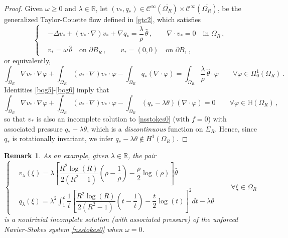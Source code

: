 \documentclass[a4paper,11pt]{article}
\newtheorem{remark}[theorem]{Remark}
\numberwithin{equation}{section}
\numberwithin{figure}{section}
\begin{document}
\begin{proof}
Given $\omega \geq 0$ and $\lambda \in \mathbb{R}$, let $(v_{*},q_{*}) \in \mathcal{C}^\infty(\overline{\Omega_{R}}) \times
\mathcal{C}^\infty(\overline{\Omega_{R}})$, be the generalized Taylor-Couette flow defined in \eqref{gtc2}, which satisfies
$$
\left\{
\begin{aligned}
	& -\Delta v_{*}+ (v_{*}\cdot\nabla)v_{*}+ \nabla q_{*}=\dfrac{\lambda}{\rho}\, \widehat{\theta}\, ,\qquad \nabla\cdot v_{*}=0 \quad\mbox{in }
\Omega_{R}\, , \\[3pt]
	&  v_{*}= \omega \, \widehat{\theta} \quad\mbox{on }\partial B_R\, , \qquad v_{*} = (0,0) \quad\mbox{on }\partial B_{1} \, ,
\end{aligned}
\right.
$$
or equivalently,
\begin{equation} \label{bog6}
\int_{\Omega_{R}} \nabla v_{*} \cdot \nabla \varphi + \int_{\Omega_{R}} (v_{*} \cdot \nabla) v_{*} \cdot \varphi  - \int_{\Omega_{R}} q_{*}
(\nabla \cdot \varphi) = \int_{\Omega_{R}} \dfrac{\lambda}{\rho} \, \widehat{\theta} \cdot \varphi \qquad \forall \varphi \in
H_{0}^{1}(\Omega_{R}) \, .
\end{equation}
Identities \eqref{bog5}-\eqref{bog6} imply that
$$
	\int_{\Omega_{R}} \nabla v_{*} \cdot \nabla \varphi + \int_{\Omega_{R}} (v_{*} \cdot \nabla) v_{*} \cdot \varphi  - \int_{\Omega_{R}} (q_{*} -
\lambda \theta) (\nabla \cdot \varphi) = 0 \qquad \forall \varphi \in \mathbb{H}(\Omega_{R}) \, ,
$$
so that $v_{*}$ is also an incomplete solution to \eqref{nsstokes0} (with $f=0$) with associated pressure $q_{*}
- \lambda \theta$, which is a \textit{discontinuous} function on $\Sigma_{R}$. Hence, since $q_{*}$ is rotationally invariant, we infer
$q_{*} - \lambda \theta \notin H^{1}(\Omega_{R})$.
\end{proof}

\begin{remark}
As an example, given $\lambda \in \mathbb{R}$, the pair
$$
\left\{
\begin{aligned}
& v_{\lambda}(\xi) = \lambda \left[ \dfrac{R^{2} \log(R)}{2(R^2 - 1)} \left( \rho - \dfrac{1}{\rho} \right) - \dfrac{\rho}{2} \log(\rho) \right]
\widehat{\theta} \\[6pt]
& q_{\lambda}(\xi) = \lambda^{2} \int_{1}^{\rho} \dfrac{1}{t} \left[ \dfrac{R^{2} \log(R)}{2(R^2 - 1)}  \left( t - \dfrac{1}{t} \right) -
\dfrac{t}{2} \log(t) \right]^{2} dt - \lambda \theta
\end{aligned}
\right. \qquad \forall \xi \in \overline{\Omega_{R}}
$$
is a nontrivial incomplete solution (with associated pressure) of the unforced Navier-Stokes system \eqref{nsstokes0} when $\omega=0$.
\end{remark}
\end{document}

